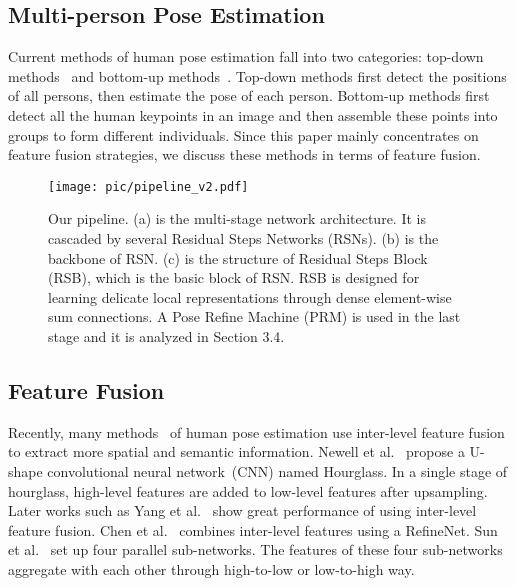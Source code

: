 \documentclass[runningheads]{llncs}
\begin{document}
\subsection{Multi-person Pose Estimation}
Current methods of human pose estimation fall into two categories: top-down methods~\cite{cpn28,cpn18,mask-rcnn,cpn9,hrnet,hourglass,toutiao,top_1,top_2,cpn,simplebase} and bottom-up methods~\cite{cmu-pose,multipose,bottom_1,bottom2}. Top-down methods first detect the positions of all persons, then estimate the pose of each person. Bottom-up methods first detect all the human keypoints in an image and then assemble these points into groups to form different individuals. 
Since this paper mainly concentrates on feature fusion strategies, we discuss these methods in terms of feature fusion.
\begin{figure*}[h]
 \centering
\texttt{[image: pic/pipeline\_v2.pdf]} \caption{Our pipeline. (a) is the multi-stage network architecture. It is cascaded by several Residual Steps Networks (RSNs). (b) is the backbone of RSN. (c) is the structure of Residual Steps Block (RSB), which is the basic block of RSN. RSB is designed for learning delicate local representations through dense element-wise sum connections. A Pose Refine Machine (PRM) is used in the last stage and it is analyzed in Section 3.4.
 } \label{fig:pipeline} \end{figure*}
\subsection{Feature Fusion}\label{sec:fusion}
Recently, many methods~\cite{hourglass,simplebase,cpn,lpf,hrnet} of human pose estimation use inter-level feature fusion to extract more spatial and semantic information. Newell et al.~\cite{hourglass} propose a U-shape convolutional neural network~(CNN) named Hourglass. In a single stage of hourglass, high-level features are added to low-level features after upsampling. Later works such as Yang et al.~\cite{lpf} show great performance of using inter-level feature fusion. Chen et al.~\cite{cpn} combines inter-level features using a RefineNet. Sun et al.~\cite{hrnet} set up four parallel sub-networks. The features of these four sub-networks aggregate with each other through high-to-low or low-to-high way.
\end{document}
